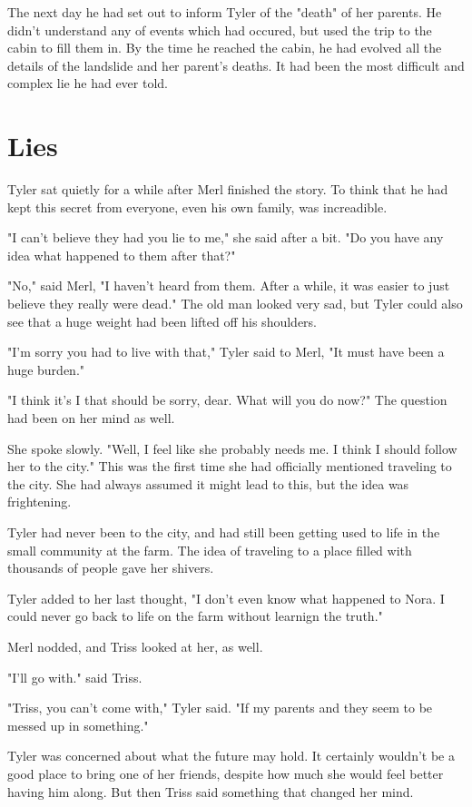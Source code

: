 \documentclass[courier]{sffms}
\begin{document}
The next day he had set out to inform Tyler of the
"death" of her parents. He didn't understand any of
events which had occured, but used the trip to
the cabin to fill them in. By the time he reached
the cabin, he had evolved all the details of the
landslide and her parent's deaths. It had been
the most difficult and complex lie he had ever told.

\chapter{Lies}
Tyler sat quietly for a while after Merl finished the
story. To think that he had kept this secret from
everyone, even his own family, was increadible.

"I can't believe they had you lie to me," she said
after a bit. "Do you have any idea what happened
to them after that?"

"No," said Merl, "I haven't heard from them. After a while,
it was easier to just believe they really were dead."
The old man looked very sad, but Tyler could also
see that a huge weight had been lifted off his 
shoulders.

"I'm sorry you had to live with that," Tyler said
to Merl, "It must have been a huge burden."

"I think it's I that should be sorry, dear. What will
you do now?" The question had been on her
mind as well.

She spoke slowly. "Well, I feel like she probably
needs me. I think I should follow her to the city."
This was the first time she had officially mentioned
traveling to the city. She had always assumed it
might lead to this, but the idea was frightening.

Tyler had never been to the city, and had
still been getting used to life in the small community
at the farm. The idea of traveling to a place filled with
thousands of people gave her shivers.

Tyler added to her last thought, "I don't even
know what happened to Nora. I could never
go back to life on the farm without learnign the
truth."

Merl nodded, and Triss looked at her, as well.

"I'll go with." said Triss.

"Triss, you can't come with," Tyler said. "If my
parents and they seem to be messed up in
something."

Tyler was concerned about what the future
may hold. It certainly wouldn't be a good place
to bring one of her friends, despite how much
she would feel better having him along. But
then Triss said something that changed her
mind.
\end{document}
